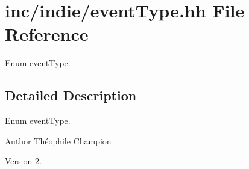 \hypertarget{eventType_8hh}{}\section{inc/indie/event\+Type.hh File Reference}
\label{eventType_8hh}


Enum event\+Type.  




\subsection{Detailed Description}
Enum event\+Type. 

\begin{DoxyAuthor}{Author}
Théophile Champion 
\end{DoxyAuthor}
\begin{DoxyVersion}{Version}
2. 
\end{DoxyVersion}

